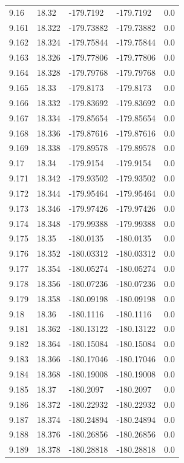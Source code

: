 \begin{tabular}{lllll}
9.16 & 18.32 & -179.7192 & -179.7192 & 0.0 \\
9.161 & 18.322 & -179.73882 & -179.73882 & 0.0 \\
9.162 & 18.324 & -179.75844 & -179.75844 & 0.0 \\
9.163 & 18.326 & -179.77806 & -179.77806 & 0.0 \\
9.164 & 18.328 & -179.79768 & -179.79768 & 0.0 \\
9.165 & 18.33 & -179.8173 & -179.8173 & 0.0 \\
9.166 & 18.332 & -179.83692 & -179.83692 & 0.0 \\
9.167 & 18.334 & -179.85654 & -179.85654 & 0.0 \\
9.168 & 18.336 & -179.87616 & -179.87616 & 0.0 \\
9.169 & 18.338 & -179.89578 & -179.89578 & 0.0 \\
9.17 & 18.34 & -179.9154 & -179.9154 & 0.0 \\
9.171 & 18.342 & -179.93502 & -179.93502 & 0.0 \\
9.172 & 18.344 & -179.95464 & -179.95464 & 0.0 \\
9.173 & 18.346 & -179.97426 & -179.97426 & 0.0 \\
9.174 & 18.348 & -179.99388 & -179.99388 & 0.0 \\
9.175 & 18.35 & -180.0135 & -180.0135 & 0.0 \\
9.176 & 18.352 & -180.03312 & -180.03312 & 0.0 \\
9.177 & 18.354 & -180.05274 & -180.05274 & 0.0 \\
9.178 & 18.356 & -180.07236 & -180.07236 & 0.0 \\
9.179 & 18.358 & -180.09198 & -180.09198 & 0.0 \\
9.18 & 18.36 & -180.1116 & -180.1116 & 0.0 \\
9.181 & 18.362 & -180.13122 & -180.13122 & 0.0 \\
9.182 & 18.364 & -180.15084 & -180.15084 & 0.0 \\
9.183 & 18.366 & -180.17046 & -180.17046 & 0.0 \\
9.184 & 18.368 & -180.19008 & -180.19008 & 0.0 \\
9.185 & 18.37 & -180.2097 & -180.2097 & 0.0 \\
9.186 & 18.372 & -180.22932 & -180.22932 & 0.0 \\
9.187 & 18.374 & -180.24894 & -180.24894 & 0.0 \\
9.188 & 18.376 & -180.26856 & -180.26856 & 0.0 \\
9.189 & 18.378 & -180.28818 & -180.28818 & 0.0 \\

\end{tabular}
